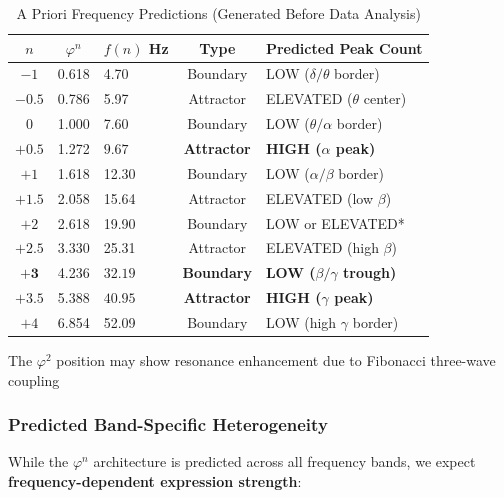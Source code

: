 \documentclass[11pt,a4paper]{article}
\newcommand{\phisym}{\varphi}
\begin{document}
\begin{table}[H]
\centering
\caption{A Priori Frequency Predictions (Generated Before Data Analysis)}
\label{tab:predictions}
\begin{tabular}{@{}cclcl@{}}
\toprule
$n$ & $\phisym^n$ & $f(n)$ Hz & Type & Predicted Peak Count \\
\midrule
$-1$ & 0.618 & 4.70 & Boundary & LOW ($\delta/\theta$ border) \\
$-0.5$ & 0.786 & 5.97 & Attractor & ELEVATED ($\theta$ center) \\
$0$ & 1.000 & 7.60 & Boundary & LOW ($\theta/\alpha$ border) \\
$\mathbf{+0.5}$ & 1.272 & $\mathbf{9.67}$ & \textbf{Attractor} & \textbf{HIGH ($\alpha$ peak)} \\
$+1$ & 1.618 & 12.30 & Boundary & LOW ($\alpha/\beta$ border) \\
$+1.5$ & 2.058 & 15.64 & Attractor & ELEVATED (low $\beta$) \\
$+2$ & 2.618 & 19.90 & Boundary & LOW or ELEVATED* \\
$+2.5$ & 3.330 & 25.31 & Attractor & ELEVATED (high $\beta$) \\
$\mathbf{+3}$ & 4.236 & $\mathbf{32.19}$ & \textbf{Boundary} & \textbf{LOW ($\beta/\gamma$ trough)} \\
$\mathbf{+3.5}$ & 5.388 & $\mathbf{40.95}$ & \textbf{Attractor} & \textbf{HIGH ($\gamma$ peak)} \\
$+4$ & 6.854 & 52.09 & Boundary & LOW (high $\gamma$ border) \\
\bottomrule
\end{tabular}
\begin{tablenotes}
\small
\item *The $\phisym^2$ position may show resonance enhancement due to Fibonacci three-wave coupling
\end{tablenotes}
\end{table}

\subsubsection{Predicted Band-Specific Heterogeneity}

While the $\phisym^n$ architecture is predicted across all frequency bands, we expect \textbf{frequency-dependent expression strength}:
\end{document}

